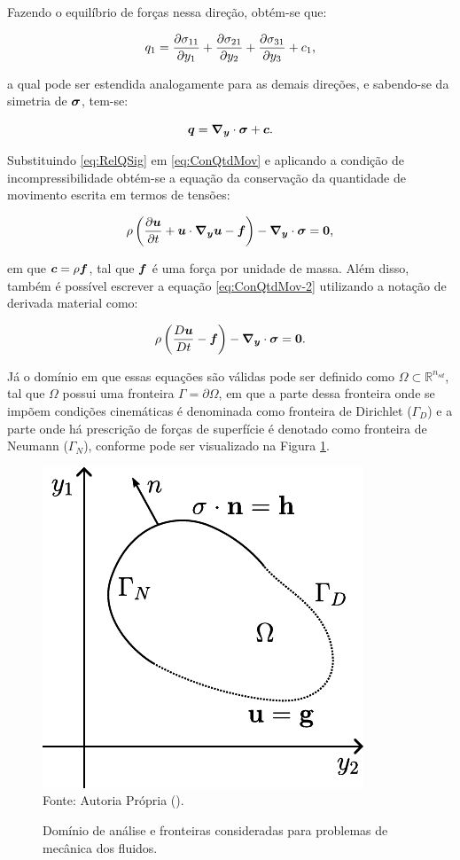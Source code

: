 Fazendo o equilíbrio de forças nessa direção, obtém-se que:

\begin{equation}
    q_1=\frac{\partial{\sigma_{11}}}{\partial{y_1}}+\frac{\partial{\sigma_{21}}}{\partial{y_2}}+\frac{\partial{\sigma_{31}}}{\partial{y_3}}+c_1\text{,}
\end{equation}

\noindent a qual pode ser estendida analogamente para as demais direções, e sabendo-se da simetria de $\boldsymbol{\sigma}$, tem-se:

\begin{equation}
    \boldsymbol{q}=\boldsymbol{\nabla_y}\cdot\boldsymbol{\sigma}+\boldsymbol{c}\text{.}
    \label{eq:RelQSig}
\end{equation}

Substituindo \eqref{eq:RelQSig} em \eqref{eq:ConQtdMov} e aplicando a condição de incompressibilidade obtém-se a equação da conservação da quantidade de movimento escrita em termos de tensões:

\begin{equation}
    \rho\left({\frac{\partial{\boldsymbol{u}}}{\partial t}+\boldsymbol{u}\cdot\boldsymbol{\nabla_y}\boldsymbol{u}-\boldsymbol{f}}\right)-\boldsymbol{\nabla_y}\cdot\boldsymbol{\sigma}=\boldsymbol{0}\text{,}
    \label{eq:ConQtdMov-2}
\end{equation}

\noindent em que $\boldsymbol{c}=\rho\boldsymbol{f}$, tal que $\boldsymbol{f}$ é uma força por unidade de massa. Além disso, também é possível escrever a equação \eqref{eq:ConQtdMov-2} utilizando a notação de derivada material como:

\begin{equation}
    \rho\left({\frac{D\boldsymbol{u}}{Dt}-\boldsymbol{f}}\right)-\boldsymbol{\nabla_y}\cdot\boldsymbol{\sigma}=\boldsymbol{0}\text{.}
    \label{eq:ConQtdMov-3}
\end{equation}

Já o domínio em que essas equações são válidas pode ser definido como $\Omega\subset\mathbb{R}^{n_{sd}}$, tal que $\Omega$ possui uma fronteira $\Gamma=\partial\Omega$, em que a parte dessa fronteira onde se impõem condições cinemáticas é denominada como fronteira de Dirichlet ($\Gamma_D$) e a parte onde há prescrição de forças de superfície é denotado como fronteira de Neumann ($\Gamma_N$), conforme pode ser visualizado na Figura \ref{fig:Dom}.

\begin{figure}[h!]
    \centering
    \caption{Domínio de análise e fronteiras consideradas para problemas de mecânica dos fluidos.}
    \includegraphics[width=.35\linewidth]{Figuras/Dom}
    \\Fonte: Autoria Própria (\the\year).
    \label{fig:Dom}
\end{figure}

